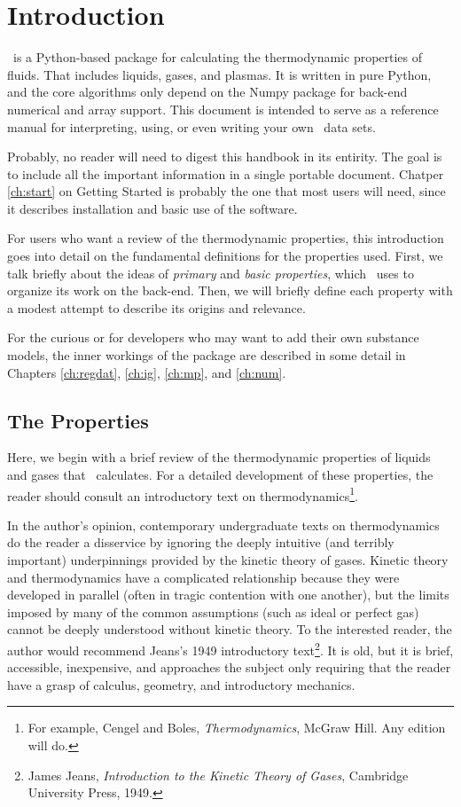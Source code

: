 \chapter{Introduction}

\PM\ is a Python-based package for calculating the thermodynamic properties of fluids.  That includes liquids, gases, and plasmas.  It is written in pure Python, and the core algorithms only depend on the Numpy package for back-end numerical and array support.  This document is intended to serve as a reference manual for interpreting, using, or even writing your own \PM\ data sets.  

Probably, no reader will need to digest this handbook in its entirity.  The goal is to include all the important information in a single portable document.  Chatper \ref{ch:start} on Getting Started is probably the one that most users will need, since it describes installation and basic use of the software.

For users who want a review of the thermodynamic properties, this introduction goes into detail on the fundamental definitions for the properties used.  First, we talk briefly about the ideas of \emph{primary} and \emph{basic properties}, which \PM\ uses to organize its work on the back-end.  Then, we will briefly define each property with a modest attempt to describe its origins and relevance.

For the curious or for developers who may want to add their own substance models, the inner workings of the package are described in some detail in Chapters \ref{ch:regdat}, \ref{ch:ig}, \ref{ch:mp}, and \ref{ch:num}.

%
%
\section{The Properties}

Here, we begin with a brief review of the thermodynamic properties of liquids and gases that \PM\ calculates.  For a detailed development of these properties, the reader should consult an introductory text on thermodynamics\footnote{For example, Cengel and Boles, \emph{Thermodynamics}, McGraw Hill.  Any edition will do.}.  

In the author's opinion, contemporary undergraduate texts on thermodynamics do the reader a disservice by ignoring the deeply intuitive (and terribly important) underpinnings provided by the kinetic theory of gases.  Kinetic theory and thermodynamics have a complicated relationship because they were developed in parallel (often in tragic contention with one another), but the limits imposed by many of the common assumptions (such as ideal or perfect gas) cannot be deeply understood without kinetic theory.  To the interested reader, the author would recommend Jeans's 1949 introductory text\footnote{James Jeans, \emph{Introduction to the Kinetic Theory of Gases}, Cambridge University Press, 1949.}.  It is old, but it is brief, accessible, inexpensive, and approaches the subject only requiring that the reader have a grasp of calculus, geometry, and introductory mechanics.  


